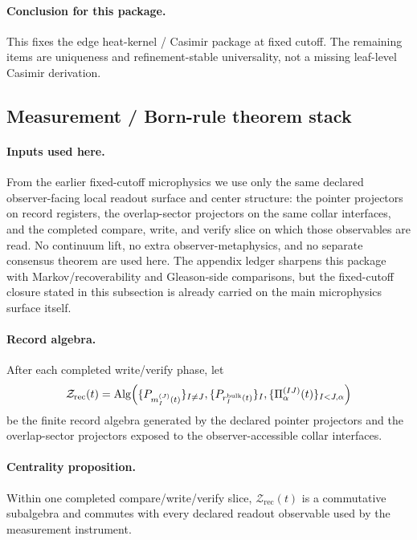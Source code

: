 \documentclass[11pt]{article}
\begin{document}
\paragraph{Conclusion for this package.}
This fixes the edge heat-kernel / Casimir package at fixed cutoff. The remaining items are uniqueness and refinement-stable universality, not a missing leaf-level Casimir derivation.

\subsection{Measurement / Born-rule theorem stack}

\paragraph{Inputs used here.}
From the earlier fixed-cutoff microphysics we use only the same declared observer-facing local
readout surface and center structure: the pointer projectors on record registers, the
overlap-sector projectors on the same collar interfaces, and the completed compare, write, and
verify slice on which those observables are read. No continuum lift, no extra
observer-metaphysics, and no separate consensus theorem are used here. The appendix ledger
sharpens this package with Markov/recoverability and Gleason-side comparisons, but the
fixed-cutoff closure stated in this subsection is already carried on the main microphysics
surface itself.

\paragraph{Record algebra.}
After each completed write/verify phase, let
\begin{equation}
\mathcal Z_{\mathrm{rec}}(t)
=
\mathrm{Alg}\Bigl(
\{P_{m_I^{(J)}(t)}\}_{I\neq J},
\{P_{r_I^{\mathrm{bulk}}(t)}\}_I,
\{\Pi_\alpha^{(IJ)}(t)\}_{I<J,\alpha}
\Bigr)
\end{equation}
be the finite record algebra generated by the declared pointer projectors and the overlap-sector
projectors exposed to the observer-accessible collar interfaces.

\paragraph{Centrality proposition.}
Within one completed compare/write/verify slice, $\mathcal Z_{\mathrm{rec}}(t)$ is a commutative
subalgebra and commutes with every declared readout observable used by the measurement instrument.
\end{document}
